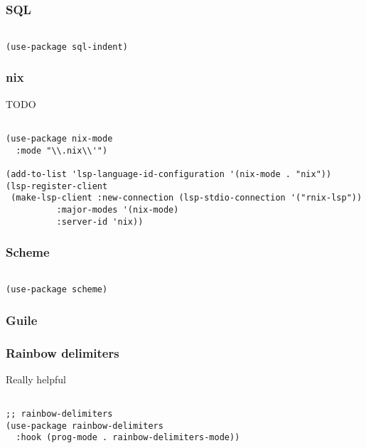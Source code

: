 \documentclass[11pt]{article}
\begin{document}
\subsubsection{SQL}
\label{sec:org7e8dc30}

\begin{verbatim}

(use-package sql-indent)

\end{verbatim}

\subsubsection{nix}
\label{sec:org6f2b57a}

TODO

\begin{verbatim}

(use-package nix-mode
  :mode "\\.nix\\'")

(add-to-list 'lsp-language-id-configuration '(nix-mode . "nix"))
(lsp-register-client
 (make-lsp-client :new-connection (lsp-stdio-connection '("rnix-lsp"))
		  :major-modes '(nix-mode)
		  :server-id 'nix))

\end{verbatim}

\subsubsection{Scheme}
\label{sec:org7660b35}

\begin{verbatim}

(use-package scheme)

\end{verbatim}

\subsubsection{Guile}
\label{sec:orgd380f5c}

\subsubsection{Rainbow delimiters}
\label{sec:orgfee2c74}

Really helpful

\begin{verbatim}

;; rainbow-delimiters
(use-package rainbow-delimiters
  :hook (prog-mode . rainbow-delimiters-mode))

\end{verbatim}
\end{document}
